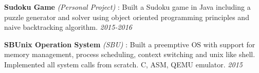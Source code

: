 \documentclass[12pt]{article}
\newcommand{\sectionHeading}[1]{
\vspace{-15pt}
\section*{\small{#1}}
\vspace{-10pt}
\hrule
\vspace{8pt}
}
\newcommand{\sectionHeadingWithLink}[2]{
\vspace{-15pt}
\section*{\small{#1 \textit{#2}}}
\vspace{-10pt}
\hrule
\vspace{8pt}
}
\newcommand {\projectSectionSubheading}[4]{
    \noindent \small{\textbf{#1} \textit{(#2)} : #3  \hfill \textit{#4}} \\
    \vspace{-10pt}
}
\newcommand{\sectionListStart}{
    \begin{itemize}[label={\small{\textbullet}}, leftmargin=20pt] %
}
\newcommand{\sectionListEnd}{\end{itemize} \vspace{0pt}}
\newcommand{\sectionListItem}[1]{\item \small{#1}}
\begin{document}
\projectSectionSubheading{Sudoku Game}{Personal Project}{Built a Sudoku game in Java including a puzzle generator and solver using object oriented programming principles and naive backtracking algorithm.}{2015-2016}

\projectSectionSubheading{SBUnix Operation System}{SBU}{Built a preemptive OS with support for memory management, process scheduling, context switching and unix like shell. Implemented all system calls from scratch. C, ASM, QEMU emulator.}{2015}


\vspace{5pt}





\end{document}
